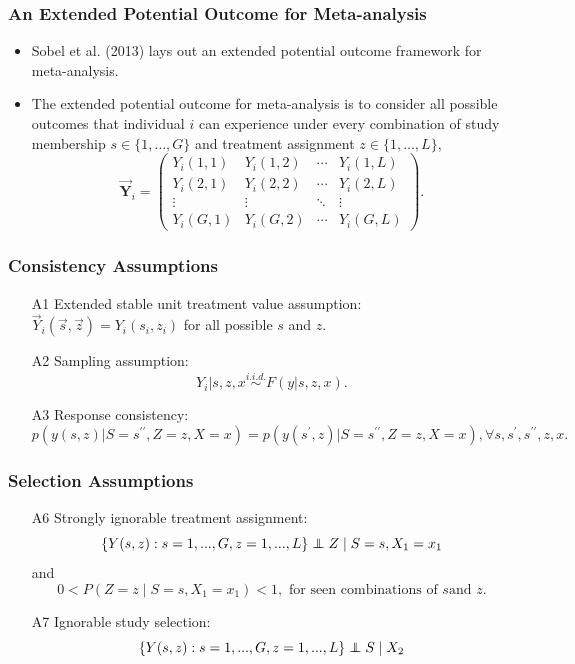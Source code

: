\documentclass[xetex,mathserif,serif]{beamer}
\newcommand\independent{\protect\mathpalette{\protect\independenT}{\perp}}
\def\independenT#1#2{\mathrel{\rlap{$#1#2$}\mkern2mu{#1#2}}}
\begin{document}
\begin{frame}
  \frametitle{An Extended Potential Outcome for Meta-analysis}
  \begin{itemize}
  \item Sobel et al. (2013) lays out an extended potential outcome framework for
    meta-analysis.
  \item The extended potential outcome for meta-analysis is to consider all
    possible outcomes that individual $i$ can experience under every combination
    of study membership $s\in\{1,\ldots,G\}$ and treatment assignment
    $z\in\{1,\ldots,L\}$,
    \begin{equation*}
      \label{eq:fpo}
      \bm \vec Y_i=
      \begin{pmatrix}
        Y_i(1,1) & Y_i(1,2) & \cdots & Y_i(1,L)\\
        Y_i(2,1) & Y_i(2,2) & \cdots & Y_i(2,L)\\
        \vdots & \vdots & \ddots & \vdots\\
        Y_i(G,1) & Y_i(G,2) & \cdots & Y_i(G,L)
      \end{pmatrix}.
    \end{equation*}
  \end{itemize}
\end{frame}

\begin{frame}
  \frametitle{Consistency Assumptions}
  \begin{itemize}
  \item[A1] Extended stable unit treatment value assumption: $\vec Y_i(\vec
    s,\vec z)=Y_i(s_i, z_i)$ for all possible $s$ and $z$.
  \item[A2] Sampling assumption: \[Y_i|s,z,x\stackrel{i.i.d.}{\sim}F(y|s,z,x).\]
  \item[A3] Response consistency:
    \[p(y(s,z)|S=s^{\prime\prime},Z=z, X=x)=p(y(s^\prime,z)|S=s^{\prime\prime},
    Z=z,X=x),\forall s,s^\prime,s^{\prime\prime},z, x.\]
  \end{itemize}
\end{frame}

\begin{frame}
  \frametitle{Selection Assumptions}
  \begin{itemize}
  \item[A6] Strongly ignorable treatment assignment:\\
     \[\{Y(s,z):s = 1,...,G, z = 1,...,L\} \independent Z\mid S = s, X_1 =
     x_1\] and
     \[0<P(Z=z\mid S=s, X_1=x_1)<1, \text{ for seen combinations of } s \text{
       and }z.\]
   \item[A7] Ignorable study selection: \\
     \[\{Y(s,z): s = 1,...,G, z = 1,...,L\} \independent S \mid X_2\]
  \end{itemize}
\end{frame}
\end{document}
